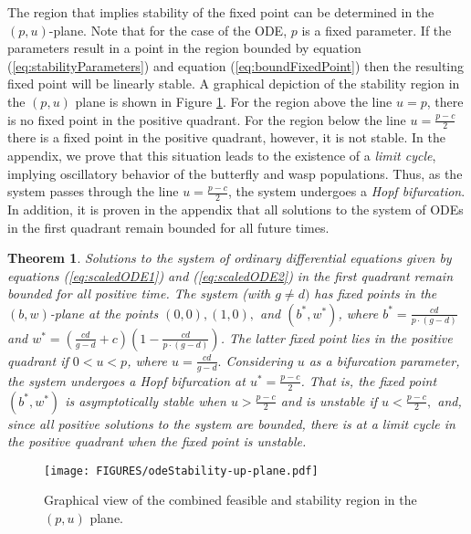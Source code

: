 \documentclass[review,authoryear]{elsarticle}
\newtheorem{theorem}{Theorem}[section]
\begin{document}
The region that implies stability of the fixed point can be
determined in the $(p,u)$-plane. Note that for the case of the ODE, $p$ is a fixed parameter. If the parameters result in a point in
the region bounded by equation (\ref{eq:stabilityParameters}) and
equation (\ref{eq:boundFixedPoint}) then the resulting
fixed point will be linearly stable. A graphical depiction of the
stability region in the $(p,u)$ plane is shown in Figure
\ref{fig:uvStabilityRegion}. For the region above the line $u=p$, there is no fixed point in the positive quadrant.  For the region below the line $u = \frac{p-c}{2}$ there is   a fixed point in the positive quadrant, however, it is not stable.  In the appendix, we prove that this situation leads to the existence of a \emph{limit cycle}, implying oscillatory behavior of the butterfly and wasp populations. Thus, as the system passes through the line $u = \frac{p-c}{2}$, the system undergoes a \emph{Hopf bifurcation}. In addition, it is proven in the appendix that all solutions to the system of ODEs in the first quadrant remain bounded for all future times.  

\begin{theorem}  Solutions to the  system of ordinary differential equations given by equations (\ref{eq:scaledODE1}) and (\ref{eq:scaledODE2}) in the first quadrant remain bounded for all positive time.  The system (with $g\ne d)$ has fixed points in the $(b,w)$-plane at the points $(0,0), (1,0),$ and $(b^*,w^*)$, where $b^*=\frac{cd}{p\cdot (g-d)}$ and
$w^*=\left(\frac{cd}{g-d}+c\right)\left(1-\frac{cd}{p\cdot (g-d)}\right)$.  The latter fixed point lies in the positive quadrant if $0<u<p$, where $u=\frac{cd}{g-d}.$
Considering $u$ as a bifurcation parameter, the system undergoes a Hopf bifurcation at $u^* = \frac{p-c}{2}$.  
That is, the fixed point $(b^*,w^*)$ is asymptotically stable when $u>\frac{p-c}{2}$ and is unstable if $u<\frac{p-c}{2},$ and, since all positive solutions to the system are bounded,  there is at a  limit cycle in the positive quadrant when the fixed point is unstable.

\end{theorem}

\begin{figure}[htb]
  \centering
  \texttt{[image: FIGURES/odeStability-up-plane.pdf]}
  \caption[Stability region in the $(p,u)$ plane.]{Graphical view of the
    combined feasible and stability region in the $(p,u)$ plane.}
  \label{fig:uvStabilityRegion}
\end{figure}
\end{document}
